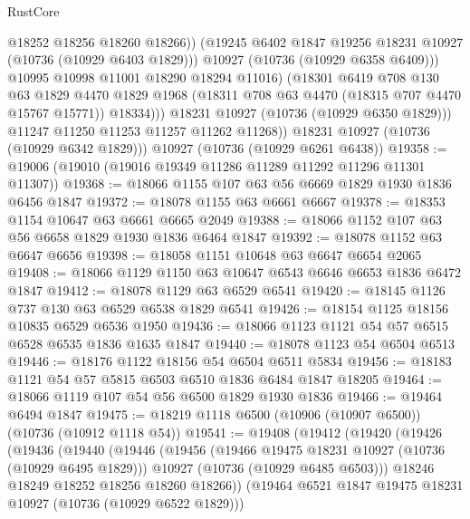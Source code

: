 \begin{lexlean}{RustCore}
\begin{coremodule}
                        @18252
                        @18256
                        @18260
                        @18266))
                    (@19245 @6402 @1847 @19256 @18231 @10927 (@10736 (@10929 @6403 @1829)))
                    @10927
                    (@10736 (@10929 @6358 @6409)))
                  @10995
                  @10998
                  @11001
                  @18290
                  @18294
                  @11016)
                (@18301
                  @6419
                  @708
                  @130
                  @63
                  @1829
                  @4470
                  @1829
                  @1968
                  (@18311 @708 @63 @4470 (@18315 @707 @4470 @15767 @15771))
                  @18334)))
            @18231
            @10927
            (@10736 (@10929 @6350 @1829)))
          @11247
          @11250
          @11253
          @11257
          @11262
          @11268))
      @18231
      @10927
      (@10736 (@10929 @6342 @1829)))
    @10927
    (@10736 (@10929 @6261 @6438))
@19358 := @19006 (@19010 (@19016 @19349 @11286 @11289 @11292 @11296 @11301 @11307))
@19368 := @18066 @1155 @107 @63 @56 @6669 @1829 @1930 @1836 @6456 @1847
@19372 := @18078 @1155 @63 @6661 @6667
@19378 := @18353 @1154 @10647 @63 @6661 @6665 @2049
@19388 := @18066 @1152 @107 @63 @56 @6658 @1829 @1930 @1836 @6464 @1847
@19392 := @18078 @1152 @63 @6647 @6656
@19398 := @18058 @1151 @10648 @63 @6647 @6654 @2065
@19408 := @18066 @1129 @1150 @63 @10647 @6543 @6646 @6653 @1836 @6472 @1847
@19412 := @18078 @1129 @63 @6529 @6541
@19420 := @18145 @1126 @737 @130 @63 @6529 @6538 @1829 @6541
@19426 := @18154 @1125 @18156 @10835 @6529 @6536 @1950
@19436 := @18066 @1123 @1121 @54 @57 @6515 @6528 @6535 @1836 @1635 @1847
@19440 := @18078 @1123 @54 @6504 @6513
@19446 := @18176 @1122 @18156 @54 @6504 @6511 @5834
@19456 := @18183 @1121 @54 @57 @5815 @6503 @6510 @1836 @6484 @1847 @18205
@19464 := @18066 @1119 @107 @54 @56 @6500 @1829 @1930 @1836
@19466 := @19464 @6494 @1847
@19475 := @18219 @1118 @6500 (@10906 (@10907 @6500)) (@10736 (@10912 @1118 @54))
@19541 := @19408
    (@19412
      (@19420
        (@19426
          (@19436
            (@19440
              (@19446
                (@19456
                  (@19466 @19475 @18231 @10927 (@10736 (@10929 @6495 @1829)))
                  @10927
                  (@10736 (@10929 @6485 @6503)))
                @18246
                @18249
                @18252
                @18256
                @18260
                @18266))
            (@19464 @6521 @1847 @19475 @18231 @10927 (@10736 (@10929 @6522 @1829)))

\end{coremodule}
\end{lexlean}
